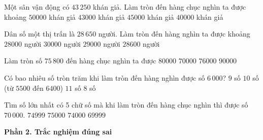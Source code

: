 \begin{ex} %
Một sân vận động có $43\,250$ khán giả. Làm tròn đến hàng chục nghìn ta được khoảng
\choice
{$50000$ khán giả}
{$43000$ khán giả}
{$45000$ khán giả}
{\True $40000$ khán giả}
\end{ex}

\begin{ex} %
Dân số một thị trấn là $28\,650$ người. Làm tròn đến hàng nghìn ta được khoảng
\choice
{$28000$ người}
{$30000$ người}
{\True $29000$ người}
{$28600$ người}
\end{ex}

\begin{ex} %
Làm tròn số $75\,800$ đến hàng chục nghìn ta được
\choice
{\True $80000$}
{$70000$}
{$76000$}
{$90000$}
\end{ex}

\begin{ex} %
Có bao nhiêu số tròn trăm khi làm tròn đến hàng nghìn được số $6\,000$?
\choice
{$9$ số}
{\True $10$ số (từ $5500$ đến $6400$)}
{$11$ số}
{$8$ số}
\end{ex}

\begin{ex} %
Tìm số lớn nhất có 5 chữ số mà khi làm tròn đến hàng chục nghìn thì được số $70\,000$.
\choice
{\True $74999$}
{$75000$}
{$74000$}
{$69999$}
\end{ex}

\textbf{Phần 2. Trắc nghiệm đúng sai}

